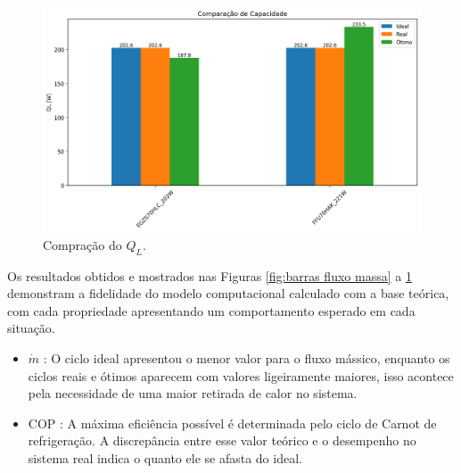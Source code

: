 \begin{figure}[ht]
    \centering
    \includegraphics[width=0.8\linewidth]{Imagens/Desenvolvimento/barras_QL.png}
    \caption{Compração do $Q_L$.}
    \label{fig:barras Ql}
\end{figure}



Os resultados obtidos e mostrados nas Figuras \ref{fig:barras fluxo massa} a \ref{fig:barras Ql} demonstram a fidelidade do modelo computacional calculado com a base teórica, com  cada propriedade apresentando um comportamento esperado em cada situação.

    \begin{itemize}
        \item $\dot{m}$ : O ciclo ideal apresentou o menor valor para o fluxo mássico, enquanto os ciclos reais e ótimos aparecem com valores ligeiramente maiores, isso acontece pela necessidade de uma maior retirada de calor no sistema.
        \item COP : A máxima eficiência possível é determinada pelo ciclo de Carnot de refrigeração. A discrepância entre esse valor teórico e o desempenho no sistema real indica o quanto ele se afasta do ideal.
    \end{itemize}

